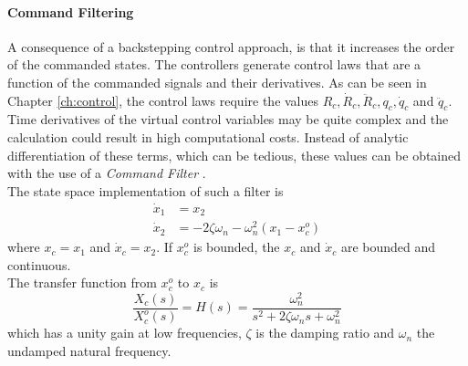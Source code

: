 \paragraph{Command Filtering}
A consequence of a backstepping control approach, is that it increases the order of the commanded states. 
The controllers generate control laws that are a function of the commanded signals and their derivatives.
As can be seen in Chapter \ref{ch:control}, the control laws require the values $ R_c, \dot{R}_c, \ddot{R}_c, q_c, \dot{q}_c $ and $ \ddot{q}_c $.
Time derivatives of the virtual control variables may be quite complex and the calculation could result in high computational costs.
Instead of analytic differentiation of these terms, which can be tedious, these values can be obtained with the use of a \textit{Command Filter} \cite{Farrell2008,Farrell2005}. \\
The state space implementation of such a filter is 
\begin{equation}\label{key}
\begin{aligned}
\dot{x}_1 &= x_2\\ %
\dot{x}_2 &= -2\zeta \omega_{n}-\omega_{n}^2(x_1-x_c^o)
\end{aligned}
\end{equation}
where $ x_c=x_1 $ and $ \dot{x}_c =x_2$. If $ x_c^o $ is bounded, the $ x_c $ and $ \dot{x}_c $ are bounded and continuous.\\
The transfer function from $ x_c^o $ to $ x_c $ is 
\begin{equation}\label{key}
\frac{X_c(s)}{X_c^o(s)}=H(s)=\frac{\omega_{n}^2}{s^2+2\zeta\omega_{n}s+\omega_{n}^2}
\end{equation}
which has a unity gain at low frequencies, $ \zeta $ is the damping ratio and $ \omega_n $ the undamped natural frequency. 

